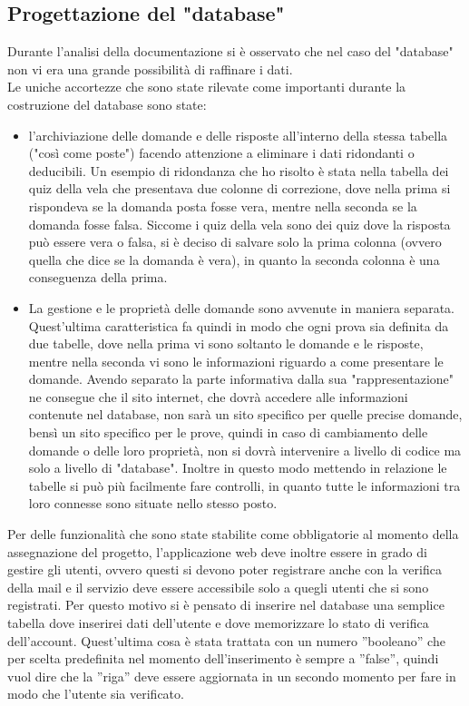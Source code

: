 \subsection{Progettazione del "database"}
\raggedright
Durante l'analisi della documentazione si è osservato che nel caso del "database" non vi era una grande possibilità di raffinare i dati.\\
Le uniche accortezze che sono state rilevate come importanti durante la costruzione del database sono state:
\begin{itemize}
	\item l'archiviazione delle domande e delle risposte all'interno della stessa tabella ("così come poste") facendo attenzione a eliminare i dati ridondanti o deducibili. Un esempio di ridondanza che ho risolto è stata nella tabella dei quiz della vela che presentava due colonne di correzione, dove nella prima si rispondeva se la domanda posta fosse vera, mentre nella seconda se la domanda fosse falsa. Siccome i quiz della vela sono dei quiz dove la risposta può essere vera o falsa, si è deciso di salvare solo la prima colonna (ovvero quella che dice se la domanda è vera), in quanto la seconda colonna è una conseguenza della prima. 
	
	\item La gestione e le proprietà delle domande sono avvenute in maniera separata. Quest'ultima caratteristica fa quindi in modo che ogni prova sia definita da due tabelle, dove nella prima vi sono soltanto le domande e le risposte, mentre nella seconda vi sono le informazioni riguardo a come presentare le domande. Avendo separato la parte informativa dalla sua "rappresentazione" ne consegue che il sito internet, che dovrà accedere alle informazioni contenute nel database, non sarà un sito specifico per quelle precise domande, bensì un sito specifico per le prove, quindi in caso di cambiamento delle domande o delle loro proprietà, non si dovrà intervenire a livello di codice ma solo a livello di "database". Inoltre in questo modo mettendo in relazione le tabelle si può più facilmente fare controlli, in quanto tutte le informazioni tra loro connesse sono situate nello stesso posto.
\end{itemize}

Per delle funzionalità che sono state stabilite come obbligatorie al momento della assegnazione del progetto, l'applicazione web deve inoltre essere in grado di gestire gli utenti, ovvero questi si devono poter registrare anche con la verifica della mail e il servizio deve essere accessibile solo a quegli utenti che si sono registrati. Per questo motivo si è pensato di inserire nel database una semplice tabella dove inserirei dati dell'utente e dove memorizzare lo stato di verifica dell'account. Quest'ultima cosa è stata trattata con un numero ”booleano” che per scelta predefinita nel momento dell'inserimento è sempre a ”false”, quindi vuol dire che la ”riga” deve essere aggiornata in un secondo momento per fare in modo che l’utente sia verificato.